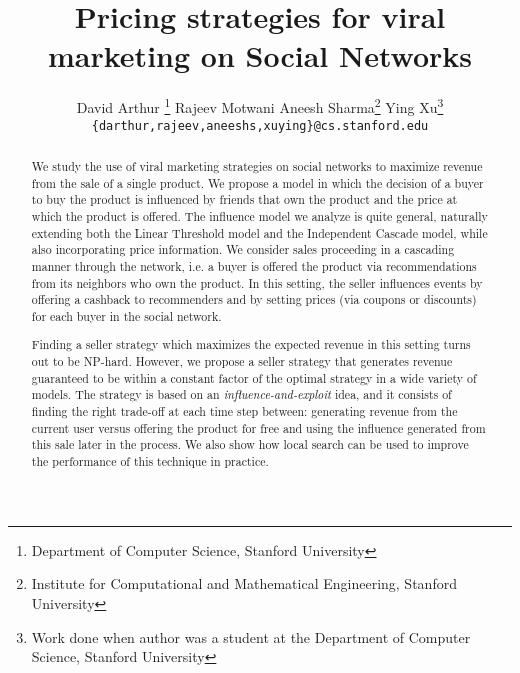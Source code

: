 \documentclass[letterpaper,twoside]{article}
\newcommand{\footnoteremember}[2]{
  \footnote{#2}
  \newcounter{#1}
  \setcounter{#1}{\value{footnote}}
}
\newcommand{\footnoterecall}[1]{
  \footnotemark[\value{#1}]
}
\begin{document}
\title{Pricing strategies for viral marketing on Social Networks}

\author{
David Arthur\footnoteremember{cs}{Department of Computer Science, Stanford
  University} \qquad
Rajeev Motwani\footnoterecall{cs} \qquad
Aneesh Sharma\footnote{Institute for Computational and Mathematical
  Engineering, Stanford University} \qquad
Ying Xu\footnote{Work done when author was a student at the Department of
  Computer Science, Stanford University} \\
{\tt \{darthur,rajeev,aneeshs,xuying\}@cs.stanford.edu}
}

\maketitle

\begin{abstract}
  We study the use of viral marketing strategies on social networks to
  maximize revenue from the sale of a single product. We propose a model in
  which the decision of a buyer to buy the product is influenced by friends
  that own the product and the price at which the product is offered. The
  influence model we analyze is quite general, naturally extending both the
  Linear Threshold model and the Independent Cascade model, while also
  incorporating price information.  We consider sales proceeding in a
  cascading manner through the network, i.e. a buyer is offered the product
  via recommendations from its neighbors who own the product. In this
  setting, the seller influences events by offering a cashback to
  recommenders and by setting prices (via coupons or discounts) for each
  buyer in the social network.

  Finding a seller strategy which maximizes the expected revenue in this
  setting turns out to be NP-hard. However, we propose a seller strategy that
  generates revenue guaranteed to be within a constant factor of the optimal
  strategy in a wide variety of models. The strategy is based on an {\em
    influence-and-exploit} idea, and it consists of finding the right
  trade-off at each time step between: generating revenue from the current
  user versus offering the product for free and using the influence generated
  from this sale later in the process.  We also show how local search can be
  used to improve the performance of this technique in practice.
\end{abstract}
\end{document}
